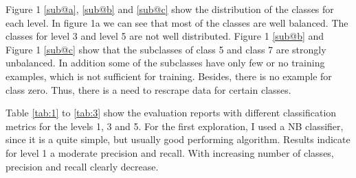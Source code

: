 \documentclass[a4paper]{article}
\begin{document}
Figure 1 \ref{sub@a}, \ref{sub@b} and \ref{sub@c} show the distribution of the classes for each level. In figure 1a we can see that most of the classes are well balanced. The classes for level 3 and level 5 are not well distributed. Figure 1 \ref{sub@b} and Figure 1 \ref{sub@c} show that the subclasses of class 5 and class 7 are strongly unbalanced. In addition some of the subclasses have only few or no training examples, which is not sufficient for training. Besides, there is no example for class zero. Thus, there is a need to rescrape data for certain classes. 


\begin{figure}\centering
  \hfill
  \par 
  \label{fig}
\end{figure}

Table \ref{tab:1} to \ref{tab:3} show the evaluation reports with different classification metrics for the levels 1, 3 and 5. For the first exploration, I used a NB classifier, since it is a quite simple, but usually good performing algorithm. Results indicate for level 1 a moderate precision and recall. With increasing number of classes, precision and recall clearly decrease. 
\end{document}
